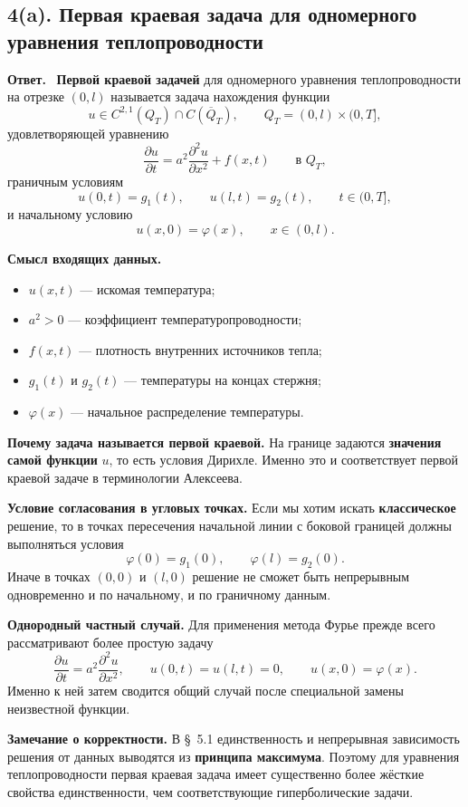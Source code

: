 \documentclass[a4paper,12pt]{article}
\newcommand{\Answer}{\textbf{Ответ.}\ }
\begin{document}
\subsection*{4(a). Первая краевая задача для одномерного уравнения теплопроводности}

\Answer
\textbf{Первой краевой задачей} для одномерного уравнения теплопроводности на отрезке $(0,l)$ называется задача нахождения функции
\[
u\in C^{2,1}(Q_T)\cap C(\overline Q_T),
\qquad
Q_T=(0,l)\times(0,T],
\]
удовлетворяющей уравнению
\[
\frac{\partial u}{\partial t}=a^2\frac{\partial^2u}{\partial x^2}+f(x,t)
\qquad \text{в } Q_T,
\]
граничным условиям
\[
u(0,t)=g_1(t),
\qquad
u(l,t)=g_2(t),
\qquad
t\in(0,T],
\]
и начальному условию
\[
u(x,0)=\varphi(x),
\qquad
x\in(0,l).
\]

\textbf{Смысл входящих данных.}
\begin{itemize}
  \item $u(x,t)$ --- искомая температура;
  \item $a^2>0$ --- коэффициент температуропроводности;
  \item $f(x,t)$ --- плотность внутренних источников тепла;
  \item $g_1(t)$ и $g_2(t)$ --- температуры на концах стержня;
  \item $\varphi(x)$ --- начальное распределение температуры.
\end{itemize}

\textbf{Почему задача называется первой краевой.}
На границе задаются \textbf{значения самой функции} $u$, то есть условия Дирихле. Именно это и соответствует первой краевой задаче в терминологии Алексеева.

\textbf{Условие согласования в угловых точках.}
Если мы хотим искать \textbf{классическое} решение, то в точках пересечения начальной линии с боковой границей должны выполняться условия
\[
\varphi(0)=g_1(0),
\qquad
\varphi(l)=g_2(0).
\]
Иначе в точках $(0,0)$ и $(l,0)$ решение не сможет быть непрерывным одновременно и по начальному, и по граничному данным.

\textbf{Однородный частный случай.}
Для применения метода Фурье прежде всего рассматривают более простую задачу
\[
\frac{\partial u}{\partial t}=a^2\frac{\partial^2u}{\partial x^2},
\qquad
u(0,t)=u(l,t)=0,
\qquad
u(x,0)=\varphi(x).
\]
Именно к ней затем сводится общий случай после специальной замены неизвестной функции.

\textbf{Замечание о корректности.}
В \S~5.1 единственность и непрерывная зависимость решения от данных выводятся из \textbf{принципа максимума}. Поэтому для уравнения теплопроводности первая краевая задача имеет существенно более жёсткие свойства единственности, чем соответствующие гиперболические задачи.
\end{document}
